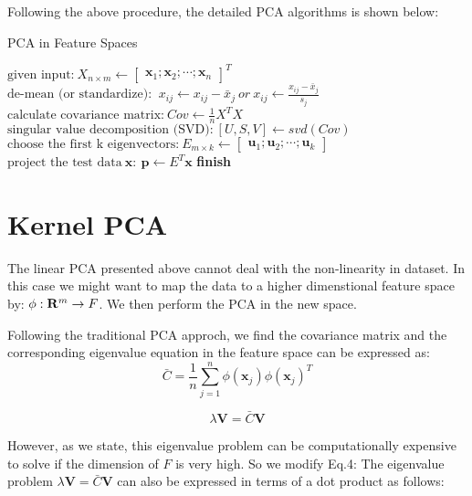 Following the above procedure, the detailed PCA algorithms is shown below:\\

\begin{algorithm}[H]
\caption{PCA in Feature Spaces}
\label{PCA}
\begin{algorithmic}[1]
	\State $\text{given input:} \  X_{n \times m} \leftarrow \begin{bmatrix} \mathbf{x}_1; \mathbf{x}_2; \cdots; \mathbf{x}_n \end{bmatrix}^T$
	\State $\text{de-mean (or standardize): } \  x_{ij} \leftarrow x_{ij} - \bar{x}_j \  or \  x_{ij} \leftarrow \frac{x_{ij} - \bar{x}_j}{s_j}$
	\State $\text{calculate covariance matrix:} \  Cov \leftarrow \frac{1}{n} X^T X$
	\State $\text{singular value decomposition (SVD):} \  [U, S, V] \leftarrow svd(Cov)$
	\State $\text{choose the first k eigenvectors:} \  E_{m \times k} \leftarrow \begin{bmatrix} \mathbf{u}_1; \mathbf{u}_2; \cdots; \mathbf{u}_k \end{bmatrix}$
	\State $\text{project the test data} \  \mathbf{x}: \  \mathbf{p} \leftarrow E^T \mathbf{x}$
\BState \bf finish
\EndProcedure
\end{algorithmic}
\end{algorithm}


\section{Kernel PCA}

The linear PCA presented above cannot deal with the non-linearity in dataset.
In this case we might want to map the data to a higher dimenstional feature space by: $\phi: \bold{R}^m \rightarrow F$.
We then perform the PCA in the new space.

Following the traditional PCA approch, we find the covariance matrix and the corresponding eigenvalue equation in the feature space can be expressed as:
\begin{equation}
\bar{C} = \frac{1}{n} \sum_{j=1}^n \phi(\pmb{x}_j) \phi(\pmb{x}_j)^T
\end{equation}

\begin{equation}
\lambda \pmb{V} = \bar{C} \pmb{V}
\end{equation}

However, as we state, this eigenvalue problem can be computationally expensive to solve if the dimension of $F$ is very high.
So we modify Eq.4: The eigenvalue problem $\lambda \pmb{V} = \bar{C} \pmb{V}$ can also be expressed in terms of a dot product as follows:

